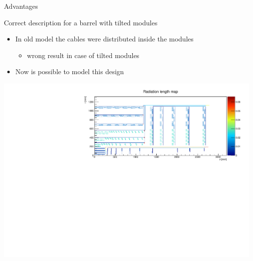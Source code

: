 \documentclass[pdftex, 11pt]{beamer}
\begin{document}
\begin{frame}{Advantages}
  \begin{block}{Correct description for a barrel with \alert{tilted} modules}
    \begin{itemize}
    \item In old model the cables were distributed \alert{inside} the modules
      \begin{itemize}
      \item \alert{wrong} result in case of tilted modules
      \end{itemize}
      \pause
    \item Now is \alert{possible} to model this design
    \end{itemize}
  \end{block}
  \begin{center}
    \includegraphics[width=\textwidth]{img/tilted.pdf}
  \end{center}
\end{frame}
\end{document}

